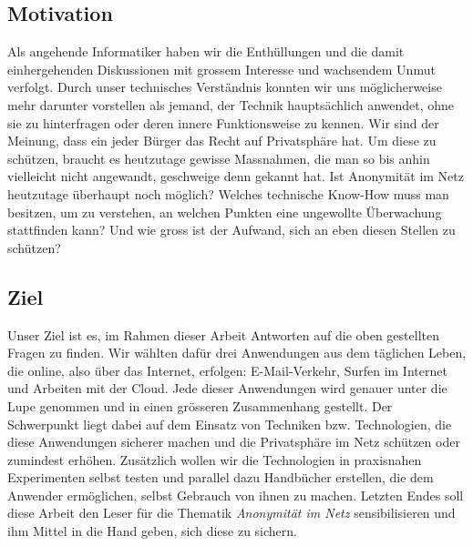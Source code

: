 \subsection{Motivation}
Als angehende Informatiker haben wir die Enthüllungen und die damit einhergehenden Diskussionen mit grossem Interesse und wachsendem Unmut verfolgt. Durch unser technisches Verständnis konnten wir uns möglicherweise mehr darunter vorstellen als jemand, der Technik hauptsächlich anwendet, ohne sie zu hinterfragen oder deren innere Funktionsweise zu kennen. Wir sind der Meinung, dass ein jeder Bürger das Recht auf Privatsphäre hat. Um diese zu schützen, braucht es heutzutage gewisse Massnahmen, die man so bis anhin vielleicht nicht angewandt, geschweige denn gekannt hat. Ist Anonymität im Netz heutzutage überhaupt noch möglich? Welches technische Know-How muss man besitzen, um zu verstehen, an welchen Punkten eine ungewollte Überwachung stattfinden kann? Und wie gross ist der Aufwand, sich an eben diesen Stellen zu schützen?

\subsection{Ziel}
Unser Ziel ist es, im Rahmen dieser Arbeit Antworten auf die oben gestellten Fragen zu finden. Wir wählten dafür drei Anwendungen aus dem täglichen Leben, die online, also über das Internet, erfolgen: E-Mail-Verkehr, Surfen im Internet und  Arbeiten mit der Cloud. Jede dieser Anwendungen wird genauer unter die Lupe genommen und in einen grösseren Zusammenhang gestellt. Der Schwerpunkt liegt dabei auf dem Einsatz von Techniken bzw. Technologien, die diese Anwendungen sicherer machen und die Privatsphäre im Netz schützen oder zumindest erhöhen. Zusätzlich wollen wir die Technologien in praxisnahen Experimenten selbst testen und parallel dazu Handbücher erstellen, die dem Anwender ermöglichen, selbst Gebrauch von ihnen zu machen. Letzten Endes soll diese Arbeit den Leser für die Thematik \textit{Anonymität im Netz} sensibilisieren und ihm Mittel in die Hand geben, sich diese zu sichern.
